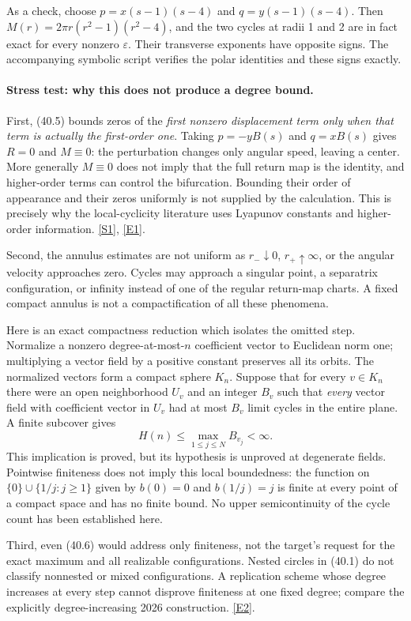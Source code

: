 \documentclass[11pt,a4paper]{article}
\newcommand{\sref}[2]{\hyperlink{source:#1:#2}{[S#2]}}
\newcommand{\eref}[2]{\hyperlink{extra:#1:#2}{[E#2]}}
\numberwithin{equation}{section}
\begin{document}
As a check, choose $p=x(s-1)(s-4)$ and $q=y(s-1)(s-4)$.
Then $M(r)=2\pi r(r^2-1)(r^2-4)$, and the two cycles at radii
1 and 2 are in fact exact for every nonzero $\varepsilon$. Their transverse
exponents have opposite signs. The accompanying symbolic script verifies
the polar identities and these signs exactly.

\paragraph{Stress test: why this does not produce a degree bound.}
First, (40.5) bounds zeros of the \emph{first nonzero displacement term
only when that term is actually the first-order one}. Taking
$p=-yB(s)$ and $q=xB(s)$ gives $R=0$ and $M\equiv0$: the perturbation
changes only angular speed, leaving a center. More generally $M\equiv0$
does not imply that the full return map is the identity, and higher-order
terms can control the bifurcation. Bounding their order of appearance and
their zeros uniformly is not supplied by the calculation. This is precisely
why the local-cyclicity literature uses Lyapunov constants and higher-order
information. \sref{40}{1}, \eref{40}{1}.

Second, the annulus estimates are not uniform as $r_-\downarrow0$,
$r_+\uparrow\infty$, or the angular velocity approaches zero. Cycles may
approach a singular point, a separatrix configuration, or infinity instead
of one of the regular return-map charts. A fixed compact annulus is not a
compactification of all these phenomena.

Here is an exact compactness reduction which isolates the omitted step.
Normalize a nonzero degree-at-most-$n$ coefficient vector to Euclidean norm
one; multiplying a vector field by a positive constant preserves all its
orbits. The normalized vectors form a compact sphere $K_n$. Suppose that
for every $v\in K_n$ there were an open neighborhood $U_v$ and an integer
$B_v$ such that \emph{every} vector field with coefficient vector in $U_v$
had at most $B_v$ limit cycles in the entire plane. A finite subcover gives
\[
 H(n)\le\max_{1\le j\le N}B_{v_j}<\infty.           \tag{40.6}
\]
This implication is proved, but its hypothesis is unproved at degenerate
fields. Pointwise finiteness does not imply this local boundedness: the
function on $\{0\}\cup\{1/j:j\ge1\}$ given by $b(0)=0$ and $b(1/j)=j$
is finite at every point of a compact space and has no finite bound.
No upper semicontinuity of the cycle count has been established here.

Third, even (40.6) would address only finiteness, not the target's request
for the exact maximum and all realizable configurations. Nested circles
in (40.1) do not classify nonnested or mixed configurations. A replication
scheme whose degree increases at every step cannot disprove finiteness at
one fixed degree; compare the explicitly degree-increasing 2026
construction. \eref{40}{2}.
\end{document}
